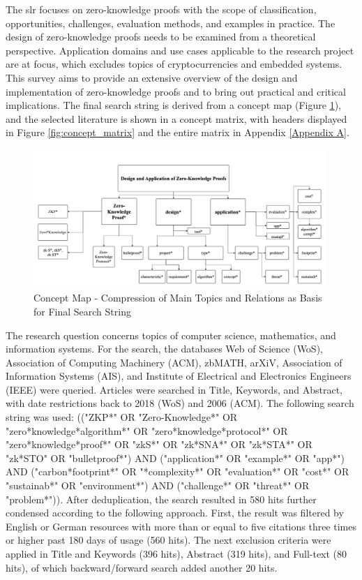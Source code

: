 The \acrshort{slr} focuses on zero-knowledge proofs with the scope of classification, opportunities, challenges, evaluation methods, and examples in practice. The design of zero-knowledge proofs needs to be examined from a theoretical perspective. Application domains and use cases applicable to the research project are at focus, which excludes topics of cryptocurrencies and embedded systems. This survey aims to provide an extensive overview of the design and implementation of zero-knowledge proofs and to bring out practical and critical implications. The final search string is derived from a concept map (Figure \ref{fig:con_map}), and the selected literature is shown in a concept matrix, with headers displayed in Figure \ref{fig:concept_matrix} and the entire matrix in Appendix \ref{Appendix A}.

\begin{figure}[hbt]
	\centering
	\includegraphics[width=0.99\textwidth]{Pictures/con_map.png}
	\caption{Concept Map - Compression of Main Topics and Relations as Basis for Final Search String}
	\label{fig:con_map}
\end{figure}

The research question concerns topics of computer science, mathematics, and information systems. For the search, the databases Web of Science (WoS), Association of Computing Machinery (ACM), zbMATH, arXiV, Association of Information Systems (AIS), and Institute of Electrical and Electronics Engineers (IEEE) were queried. Articles were searched in Title, Keywords, and Abstract, with date restrictions back to 2018 (WoS) and 2006 (ACM). The following search string was used: (("ZKP*" OR "Zero-Knowledge*" OR "zero*knowledge*algorithm*" OR "zero*knowledge*protocol*" OR "zero*knowledge*proof*" OR "zkS*" OR "zk*SNA*" OR "zk*STA*" OR "zk*STO" OR "bulletproof*") AND ("application*" OR "example*" OR "app*") AND ("carbon*footprint*" OR "*complexity*" OR "evaluation*" OR "cost*" OR "sustainab*" OR "environment*") AND ("challenge*" OR "threat*" OR "problem*")). After deduplication, the search resulted in 580 hits further condensed according to the following approach. First, the result was filtered by English or German resources with more than or equal to five citations three times or higher past 180 days of usage (560 hits). The next exclusion criteria were applied in Title and Keywords (396 hits), Abstract (319 hits), and Full-text (80 hits), of which backward/forward search added another 20 hits. 


